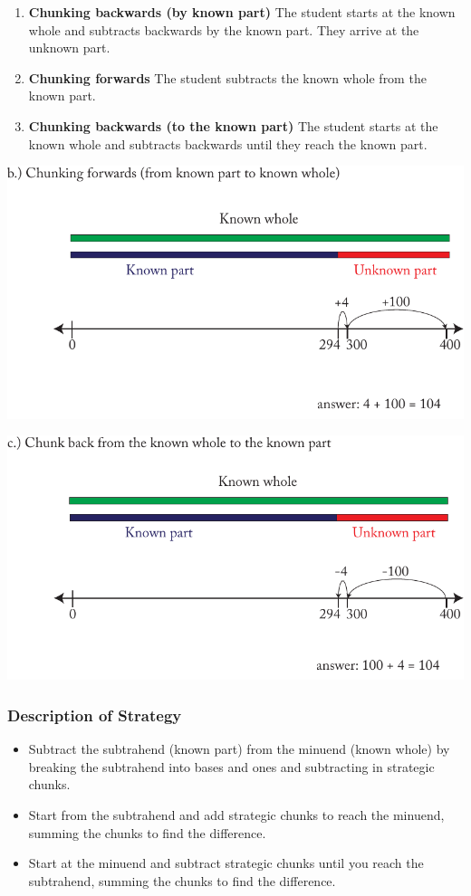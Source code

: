 \documentclass[11pt]{article}
\begin{document}
\begin{enumerate}[label=(\alph*)]
    \item \textbf{Chunking backwards (by known part)} The student starts at the known whole and subtracts backwards by the known part. They arrive at the unknown part. 
    \item \textbf{Chunking forwards} The student subtracts the known whole from the known part. 
    \item \textbf{Chunking backwards (to the known part)}  The student starts at the known whole and subtracts backwards until they reach the known part.
\end{enumerate}



\includegraphics[width=.8\textwidth]{images/Easy_Pictures/SAR_SUB_CHUNKING_3_Ways/PDF/CHUNKING_FORWARD_FROM_KNOWN_PART.pdf}


\includegraphics[width=.8\textwidth]{images/Easy_Pictures/SAR_SUB_CHUNKING_3_Ways/PDF/CHUNKING_BACKWARD_TO_KNOWN_PART.pdf}


\subsubsection*{Description of Strategy}
\begin{itemize}
    \item Subtract the subtrahend (known part) from the minuend (known whole) by breaking the subtrahend into bases and ones and subtracting in strategic chunks. 
    \item Start from the subtrahend and add strategic chunks to reach the minuend, summing the chunks to find the difference.
    \item Start at the minuend and subtract strategic chunks until you reach the subtrahend, summing the chunks to find the difference.
\end{itemize}
\end{document}
